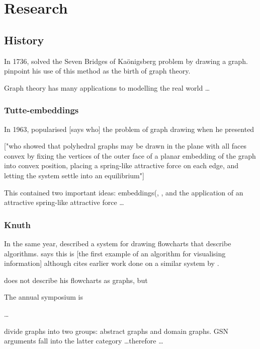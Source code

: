 \chapter{Research}


\section{History}

In 1736, \citet{euler} solved the Seven Bridges of Ka\"{o}nigsberg problem by drawing a graph.
\citet{ismail2009some}
pinpoint his use of this method as the birth of graph theory.

Graph theory has many applications to modelling the real world \ldots

\subsection{Tutte-embeddings}

In 1963, \citet{tutte} popularised [says who] the problem of graph drawing when he presented 

["who showed that polyhedral graphs may be drawn in the plane with all faces convex by fixing the vertices of the outer face of a planar embedding of the graph into convex position, placing a spring-like attractive force on each edge, and letting the system settle into an equilibrium"]

This contained two important ideas: embeddings(, , and the application of an attractive spring-like attractive force \ldots 

\subsection{Knuth}

In the same year, \citet{Knuth63} described a system for drawing flowcharts that describe algorithms. \citet{battista}  says this is [the first example of an algorithm for visualising information] although \citeauthor{Knuth63} cites earlier work done on a similar system by \citet{haibt1959}.

\citet{Knuth63} does not describe his flowcharts as graphs, but 

The annual symposium is 


\ldots

\citet{huang2007effects} divide graphs into two groups: abstract graphs and domain graphs.
GSN arguments fall into the latter category \ldots  therefore \ldots
{}




